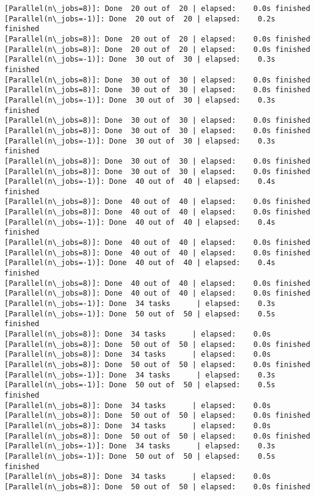 \documentclass[11pt]{article}
\begin{document}
\begin{Verbatim}[commandchars=\\\{\}]
[Parallel(n\_jobs=8)]: Done  20 out of  20 | elapsed:    0.0s finished
[Parallel(n\_jobs=-1)]: Done  20 out of  20 | elapsed:    0.2s finished
[Parallel(n\_jobs=8)]: Done  20 out of  20 | elapsed:    0.0s finished
[Parallel(n\_jobs=8)]: Done  20 out of  20 | elapsed:    0.0s finished
[Parallel(n\_jobs=-1)]: Done  30 out of  30 | elapsed:    0.3s finished
[Parallel(n\_jobs=8)]: Done  30 out of  30 | elapsed:    0.0s finished
[Parallel(n\_jobs=8)]: Done  30 out of  30 | elapsed:    0.0s finished
[Parallel(n\_jobs=-1)]: Done  30 out of  30 | elapsed:    0.3s finished
[Parallel(n\_jobs=8)]: Done  30 out of  30 | elapsed:    0.0s finished
[Parallel(n\_jobs=8)]: Done  30 out of  30 | elapsed:    0.0s finished
[Parallel(n\_jobs=-1)]: Done  30 out of  30 | elapsed:    0.3s finished
[Parallel(n\_jobs=8)]: Done  30 out of  30 | elapsed:    0.0s finished
[Parallel(n\_jobs=8)]: Done  30 out of  30 | elapsed:    0.0s finished
[Parallel(n\_jobs=-1)]: Done  40 out of  40 | elapsed:    0.4s finished
[Parallel(n\_jobs=8)]: Done  40 out of  40 | elapsed:    0.0s finished
[Parallel(n\_jobs=8)]: Done  40 out of  40 | elapsed:    0.0s finished
[Parallel(n\_jobs=-1)]: Done  40 out of  40 | elapsed:    0.4s finished
[Parallel(n\_jobs=8)]: Done  40 out of  40 | elapsed:    0.0s finished
[Parallel(n\_jobs=8)]: Done  40 out of  40 | elapsed:    0.0s finished
[Parallel(n\_jobs=-1)]: Done  40 out of  40 | elapsed:    0.4s finished
[Parallel(n\_jobs=8)]: Done  40 out of  40 | elapsed:    0.0s finished
[Parallel(n\_jobs=8)]: Done  40 out of  40 | elapsed:    0.0s finished
[Parallel(n\_jobs=-1)]: Done  34 tasks      | elapsed:    0.3s
[Parallel(n\_jobs=-1)]: Done  50 out of  50 | elapsed:    0.5s finished
[Parallel(n\_jobs=8)]: Done  34 tasks      | elapsed:    0.0s
[Parallel(n\_jobs=8)]: Done  50 out of  50 | elapsed:    0.0s finished
[Parallel(n\_jobs=8)]: Done  34 tasks      | elapsed:    0.0s
[Parallel(n\_jobs=8)]: Done  50 out of  50 | elapsed:    0.0s finished
[Parallel(n\_jobs=-1)]: Done  34 tasks      | elapsed:    0.3s
[Parallel(n\_jobs=-1)]: Done  50 out of  50 | elapsed:    0.5s finished
[Parallel(n\_jobs=8)]: Done  34 tasks      | elapsed:    0.0s
[Parallel(n\_jobs=8)]: Done  50 out of  50 | elapsed:    0.0s finished
[Parallel(n\_jobs=8)]: Done  34 tasks      | elapsed:    0.0s
[Parallel(n\_jobs=8)]: Done  50 out of  50 | elapsed:    0.0s finished
[Parallel(n\_jobs=-1)]: Done  34 tasks      | elapsed:    0.3s
[Parallel(n\_jobs=-1)]: Done  50 out of  50 | elapsed:    0.5s finished
[Parallel(n\_jobs=8)]: Done  34 tasks      | elapsed:    0.0s
[Parallel(n\_jobs=8)]: Done  50 out of  50 | elapsed:    0.0s finished

\end{Verbatim}
\end{document}
